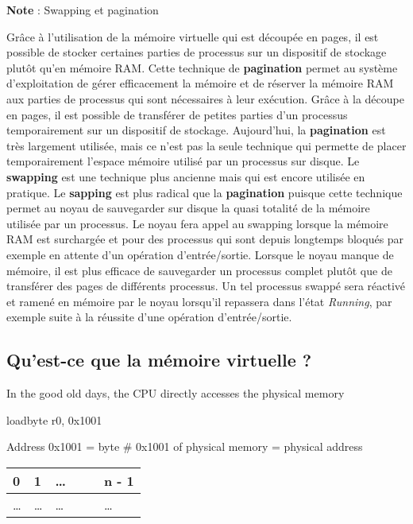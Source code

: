 \begin{framed}
  \textbf{Note} : Swapping et pagination \newline

  Grâce à l'utilisation de la mémoire virtuelle qui est découpée en
  pages, il est possible de stocker certaines parties de processus sur
  un dispositif de stockage plutôt qu'en mémoire RAM. Cette technique
  de \textbf{pagination} permet au système d'exploitation de gérer
  efficacement la mémoire et de réserver la mémoire RAM aux parties de
  processus qui sont nécessaires à leur exécution. Grâce à la découpe
  en pages, il est possible de transférer de petites parties d'un
  processus temporairement sur un dispositif de stockage. Aujourd'hui,
  la \textbf{pagination} est très largement utilisée, mais ce n'est pas
  la seule technique qui permette de placer temporairement l'espace
  mémoire utilisé par un processus sur disque. Le \textbf{swapping} est
  une technique plus ancienne mais qui est encore utilisée en pratique.
  Le \textbf{sapping} est plus radical que la \textbf{pagination}
  puisque cette technique permet au noyau de sauvegarder sur disque la
  quasi totalité de la mémoire utilisée par un processus. Le noyau fera
  appel au swapping lorsque la mémoire RAM est surchargée et pour des
  processus qui sont depuis longtemps bloqués par exemple en attente
  d'un opération d'entrée/sortie. Lorsque le noyau manque de mémoire, il
  est plus efficace de sauvegarder un processus complet plutôt que de
  transférer des pages de différents processus. Un tel processus swappé
  sera réactivé et ramené en mémoire par le noyau lorsqu'il repassera
  dans l'état \textit{Running}, par exemple suite à la réussite d'une
  opération d'entrée/sortie.
\end{framed}

\subsection{Qu'est-ce que la mémoire virtuelle ?}

In the good old days, the CPU directly accesses the physical memory

\begin{verb}
    loadbyte r0, 0x1001
\end{verb}

Address 0x1001 = byte \# 0x1001 of physical memory = physical address

\bigskip
\begin{tabular}{|l|l|l|l|l|l|}
    0 & 1 & \ldots & & & n - 1 \\
    \hline
    \ldots & \ldots & \ldots & & & \ldots \\
    \hline
\end{tabular}
\bigskip


